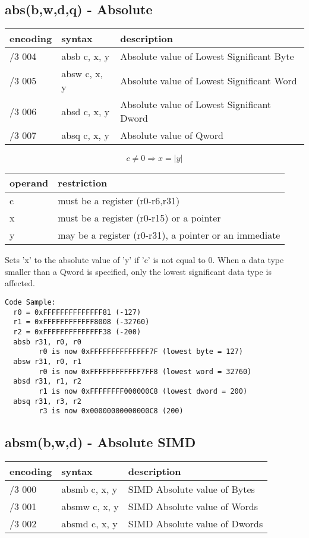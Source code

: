 \documentclass[letterpaper,10pt,openright,twoside,onecolumn]{book}
\begin{document}
\subsection{abs(b,w,d,q) - Absolute}
  \begin{tabular}{|l|l|l|}
   \hline
    encoding & syntax & description \\
   \hline
    /3 004 & absb c, x, y & Absolute value of Lowest Significant Byte \\
    /3 005 & absw c, x, y & Absolute value of Lowest Significant Word \\
    /3 006 & absd c, x, y & Absolute value of Lowest Significant Dword \\
    /3 007 & absq c, x, y & Absolute value of Qword \\
   \hline
  \end{tabular}

  \begin{displaymath} c \neq 0 \Rightarrow x = |y|\end{displaymath}

  \flushleft
  \begin{tabular}{|l|l|}
   \hline
    operand & restriction \\
   \hline
    c & must be a register (r0-r6,r31) \\
    x & must be a register (r0-r15) or a pointer \\
    y & may be a register (r0-r31), a pointer or an immediate \\
   \hline
  \end{tabular}

  Sets 'x' to the absolute value of 'y' if 'c' is not equal
  to 0.  When a data type smaller than a Qword is specified, only the
  lowest significant data type is affected.

  \begin{verbatim}
Code Sample:
  r0 = 0xFFFFFFFFFFFFFF81 (-127)
  r1 = 0xFFFFFFFFFFFF8008 (-32760)
  r2 = 0xFFFFFFFFFFFFFF38 (-200)
  absb r31, r0, r0
        r0 is now 0xFFFFFFFFFFFFFF7F (lowest byte = 127)
  absw r31, r0, r1
        r0 is now 0xFFFFFFFFFFFF7FF8 (lowest word = 32760)
  absd r31, r1, r2
        r1 is now 0xFFFFFFFF000000C8 (lowest dword = 200)
  absq r31, r3, r2
        r3 is now 0x00000000000000C8 (200)
  \end{verbatim}

\newpage\subsection{absm(b,w,d) - Absolute SIMD}
  \begin{tabular}{|l|l|l|}
   \hline
    encoding & syntax & description \\
   \hline
    /3 000 & absmb c, x, y & SIMD Absolute value of Bytes \\
    /3 001 & absmw c, x, y & SIMD Absolute value of Words \\
    /3 002 & absmd c, x, y & SIMD Absolute value of Dwords \\
   \hline
  \end{tabular}
\end{document}
